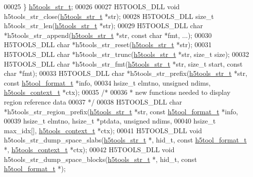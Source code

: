\begin{DoxyCode}
00025 \} \hyperlink{structh5tools__str__t}{h5tools\_str\_t};
00026 
00027 H5TOOLS\_DLL \textcolor{keywordtype}{void}     h5tools\_str\_close(\hyperlink{structh5tools__str__t}{h5tools\_str\_t} *str);
00028 H5TOOLS\_DLL \textcolor{keywordtype}{size\_t}   h5tools\_str\_len(\hyperlink{structh5tools__str__t}{h5tools\_str\_t} *str);
00029 H5TOOLS\_DLL \textcolor{keywordtype}{char}    *h5tools\_str\_append(\hyperlink{structh5tools__str__t}{h5tools\_str\_t} *str, \textcolor{keyword}{const} \textcolor{keywordtype}{char} *fmt, ...);
00030 H5TOOLS\_DLL \textcolor{keywordtype}{char}    *h5tools\_str\_reset(\hyperlink{structh5tools__str__t}{h5tools\_str\_t} *str);
00031 H5TOOLS\_DLL \textcolor{keywordtype}{char}    *h5tools\_str\_trunc(\hyperlink{structh5tools__str__t}{h5tools\_str\_t} *str, \textcolor{keywordtype}{size\_t} size);
00032 H5TOOLS\_DLL \textcolor{keywordtype}{char}    *h5tools\_str\_fmt(\hyperlink{structh5tools__str__t}{h5tools\_str\_t} *str, \textcolor{keywordtype}{size\_t} start, \textcolor{keyword}{const} \textcolor{keywordtype}{char} *fmt);
00033 H5TOOLS\_DLL \textcolor{keywordtype}{char}    *h5tools\_str\_prefix(\hyperlink{structh5tools__str__t}{h5tools\_str\_t} *str, \textcolor{keyword}{const} 
      \hyperlink{structh5tool__format__t}{h5tool\_format\_t} *info,
00034                         hsize\_t elmtno, \textcolor{keywordtype}{unsigned} ndims, \hyperlink{structh5tools__context__t}{h5tools\_context\_t} *ctx);
00035 \textcolor{comment}{/*}
00036 \textcolor{comment}{ * new functions needed to display region reference data}
00037 \textcolor{comment}{ */}
00038 H5TOOLS\_DLL \textcolor{keywordtype}{char}    *h5tools\_str\_region\_prefix(\hyperlink{structh5tools__str__t}{h5tools\_str\_t} *str, \textcolor{keyword}{const} 
      \hyperlink{structh5tool__format__t}{h5tool\_format\_t} *info,
00039                                    hsize\_t elmtno, hsize\_t *ptdata, \textcolor{keywordtype}{unsigned} ndims, 
00040                                    hsize\_t max\_idx[], \hyperlink{structh5tools__context__t}{h5tools\_context\_t} *ctx);
00041 H5TOOLS\_DLL \textcolor{keywordtype}{void}     h5tools\_str\_dump\_space\_slabs(\hyperlink{structh5tools__str__t}{h5tools\_str\_t} *, hid\_t, \textcolor{keyword}{const} 
      \hyperlink{structh5tool__format__t}{h5tool\_format\_t} *, \hyperlink{structh5tools__context__t}{h5tools\_context\_t} *ctx);
00042 H5TOOLS\_DLL \textcolor{keywordtype}{void}     h5tools\_str\_dump\_space\_blocks(\hyperlink{structh5tools__str__t}{h5tools\_str\_t} *, hid\_t, \textcolor{keyword}{const} 
      \hyperlink{structh5tool__format__t}{h5tool\_format\_t} *);

\end{DoxyCode}
